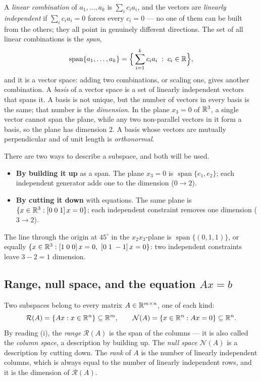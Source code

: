\documentclass[11pt]{article}
\begin{document}
A \emph{linear combination} of $a_1,\dots,a_k$ is $\sum_i c_ia_i$, and the vectors
are \emph{linearly independent} if $\sum_ic_ia_i=0$ forces every $c_i=0$ --- no one
of them can be built from the others; they all point in genuinely different
directions. The set of all linear combinations is the \emph{span},
\[
   \operatorname{span}\{a_1,\dots,a_k\} = \Bigl\{\,\sum_{i=1}^{k}c_ia_i \;:\; c_i\in\mathbb{R}\Bigr\},
\]
and it is a vector space: adding two combinations, or scaling one, gives another
combination. A \emph{basis} of a vector space is a set of linearly independent
vectors that spans it. A basis is not unique, but the number of vectors in every
basis is the same; that number is the \emph{dimension}. In the plane $x_3=0$ of
$\mathbb{R}^{3}$, a single vector cannot span the plane, while any two non-parallel vectors
in it form a basis, so the plane has dimension $2$. A basis whose vectors are
mutually perpendicular and of unit length is \emph{orthonormal}.

There are two ways to describe a subspace, and both will be used.
\begin{itemize}[leftmargin=*,itemsep=2pt]
\item \textbf{By building it up} as a span. The plane $x_3=0$ is
$\operatorname{span}\{e_1,e_2\}$; each independent generator adds one to the
dimension ($0\to2$).
\item \textbf{By cutting it down} with equations. The same plane is
$\{x\in\mathbb{R}^{3}:[0\;0\;1]\,x=0\}$; each independent constraint removes one dimension
($3\to2$).
\end{itemize}
The line through the origin at $45^\circ$ in the $x_2x_3$-plane is
$\operatorname{span}\{(0,1,1)\}$, or equally
$\{x\in\R^{3}: [1\;0\;0]\,x=0,\ [0\;1\;-1]\,x=0\}$: two independent constraints
leave $3-2=1$ dimension.

\subsection{Range, null space, and the equation \texorpdfstring{$Ax=b$}{Ax=b}}
\label{sec:rangenull}
Two subspaces belong to every matrix $A\in\mathbb{R}^{m\times n}$, one of each kind:
\begin{equation}\label{eq:rangenull}
   \mathcal R(A) = \{Ax : x\in\mathbb{R}^{n}\}\subseteq\mathbb{R}^{m},
   \qquad
   \mathcal N(A) = \{x\in\mathbb{R}^{n} : Ax=0\}\subseteq\mathbb{R}^{n}.
\end{equation}
By reading (i), the \emph{range} $\mathcal R(A)$ is the span of the columns --- it
is also called the \emph{column space}, a description by building up. The
\emph{null space} $\mathcal N(A)$ is a description by cutting down. The
\emph{rank} of $A$ is the number of linearly independent columns, which is always
equal to the number of linearly independent rows, and it is the dimension of
$\mathcal R(A)$.
\end{document}
